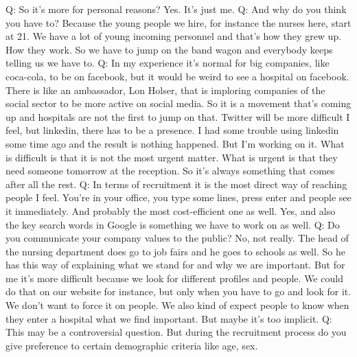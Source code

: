 \documentclass[a4paper,fleqn,11pt,dvips,titlepage]{article}
\numberwithin{figure}{section}
\numberwithin{equation}{section}
\begin{document}
Q: So it’s more for personal reasons? 
Yes. It’s just me. 
Q: And why do you think you have to? 
Because the young people we hire, for instance the nurses here, start at 21. We have a lot of young incoming personnel and that’s how they grew up. How they work.  So we have to jump on the band wagon and everybody keeps telling us we have to. 
Q: In my experience it’s normal for big companies, like coca-cola, to be on facebook, but it would be weird to see a hospital on facebook. 
There is like an ambassador, Lon Holser, that is imploring companies of the social sector to be more active on social media. So it is a movement that’s coming up and hospitals are not the first to jump on that. Twitter will be more difficult I feel, but linkedin, there has to be a presence. I had some trouble using linkedin some time ago and the result is nothing happened. But I’m working on it. What is difficult is that it is not the most urgent matter. What is urgent is that they need someone tomorrow at the reception. So it’s always something that comes after all the rest. 
Q: In terms of recruitment it is the most direct way of reaching people I feel. You’re in your office, you type some lines, press enter and people see it immediately. And probably the most cost-efficient one as well. 
Yes, and also the key search words in Google is something we have to work on as well. 
Q: Do you communicate your company values to the public? 
No, not really. The head of the nursing department does go to job fairs and he goes to schools as well. So he has this way of explaining what we stand for and why we are important. But for me it’s more difficult because we look for different profiles and people. We could do that on our website for instance, but only when you have to go and look for it. We don’t want to force it on people. We also kind of expect people to know when they enter a hospital what we find important. But maybe it’s too implicit. 
Q: This may be a controversial question. But during the recruitment process do you give preference to certain demographic criteria like age, sex.
\end{document}
